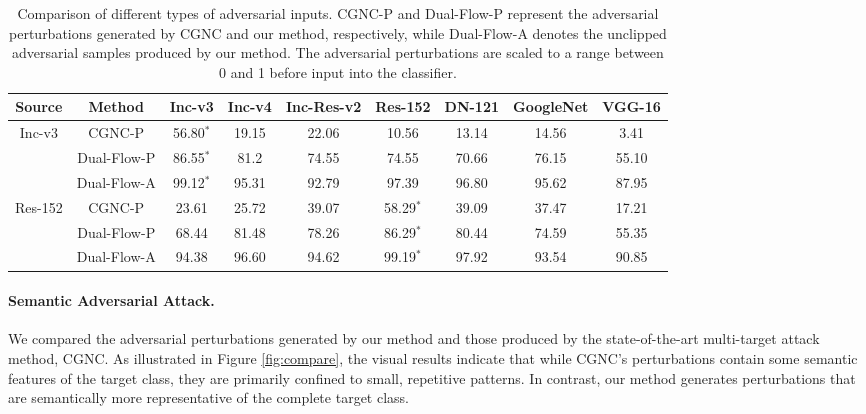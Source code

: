 \begin{table}[htbp]
  \caption{Comparison of different types of adversarial inputs. CGNC-P and Dual-Flow-P represent the adversarial perturbations generated by CGNC and our method, respectively, while Dual-Flow-A denotes the unclipped adversarial samples produced by our method. The adversarial perturbations are scaled to a range between 0 and 1 before input into the classifier.}
  \label{pert_noclip}%
  \centering
  \vskip 0.15in
  \begin{small}
  \begin{sc}

    \begin{tabular}{c|c|c|c|c|c|c|c|c}
    \toprule
    Source   & Method   & Inc-v3   & Inc-v4   & Inc-Res-v2 & Res-152   & DN-121   & GoogleNet & VGG-16\\
    \hline
    \multirow{3}[0]{*}{Inc-v3} 
             & CGNC-P  & 56.80$^{*}$    & 19.15    & 22.06    & 10.56    & 13.14    & 14.56    & 3.41\\
             & Dual-Flow-P         & 86.55$^{*}$ & 81.2 & 74.55 & 74.55 & 70.66 & 76.15 & 55.10\\
             & Dual-Flow-A & 99.12$^{*}$ & 95.31 & 92.79 & 97.39 & 96.80 & 95.62 & 87.95\\
             \hline
    \multirow{3}[0]{*}{Res-152} 
             & CGNC-P  & 23.61    & 25.72    & 39.07    & 58.29$^{*}$    & 39.09    & 37.47    & 17.21\\
             & Dual-Flow-P             & 68.44 & 81.48 & 78.26 & 86.29$^{*}$ & 80.44 & 74.59 & 55.35\\
             & Dual-Flow-A & 94.38 & 96.60 & 94.62 & 99.19$^{*}$ & 97.92 & 93.54 & 90.85\\
             \bottomrule
    \end{tabular}%
  \end{sc}
  \end{small}
  \vskip -0.1in
\end{table}%


\paragraph{Semantic Adversarial Attack.} 


We compared the adversarial perturbations generated by our method and those produced by the state-of-the-art multi-target attack method, CGNC\cite{fang2025clip}. As illustrated in Figure \ref{fig:compare}, the visual results indicate that while CGNC's perturbations contain some semantic features of the target class, they are primarily confined to small, repetitive patterns. In contrast, our method generates perturbations that are semantically more representative of the complete target class.

